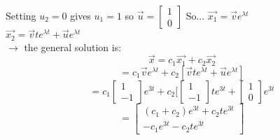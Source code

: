 \documentclass[12pt]{article}
\begin{document}
	Setting $u_2 = 0$ gives $u_1 = 1$ so $\overrightarrow{u} = \begin{bmatrix}
	1 \\ 0
	\end{bmatrix}$
	So...
	$\overrightarrow{x_1} = \overrightarrow{v}e^{\lambda t}$\\
	$\overrightarrow{x_2} = \overrightarrow{v}te^{\lambda t} + \overrightarrow{u}e^{\lambda t}$\\
	
	$\rightarrow$ the general solution is:\\
	$$\overrightarrow{x} = c_1\overrightarrow{x_1} + c_2\overrightarrow{x_2}$$
	$$= c_1\overrightarrow{v}e^{\lambda t} + c_2[\overrightarrow{v}te^{\lambda t} + \overrightarrow{u}e^{\lambda t}]$$
	$$= c_1\begin{bmatrix}
	1 \\ -1
	\end{bmatrix} e^{3t} + c_2 [ \begin{bmatrix}
	1 \\ -1
	\end{bmatrix} te^{3 t} + \begin{bmatrix} 1 \\ 0 \end{bmatrix} e^{3t}$$
	$$ = \begin{bmatrix}
	(c_1 + c_2)e^{3t} + c_2te^{3t} \\-c_1e^{3t} - c_2te^{3t}
	\end{bmatrix}$$
	
\end{document}
